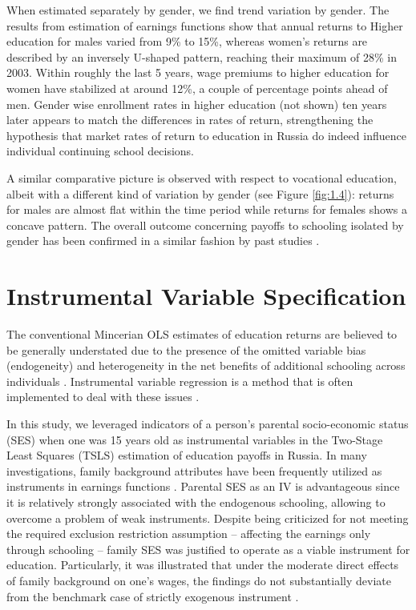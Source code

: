 \documentclass[alpha-refs]{wiley-article-01g}
\begin{document}
When estimated separately by gender, we find trend variation by gender. The results from estimation of earnings functions show that annual returns to Higher education for males varied from 9\% to 15\%, whereas women's returns are described by an inversely U-shaped pattern, reaching their maximum of 28\% in 2003. Within roughly the last 5 years, wage premiums to higher education for women have stabilized at around 12\%, a couple of percentage points ahead of men.  Gender wise enrollment rates in higher education (not shown) ten years later appears to match the differences in rates of return, strengthening the hypothesis that market rates of return to education in Russia do indeed influence individual continuing school decisions. 

A similar comparative picture is observed with respect to vocational education, albeit with a different kind of variation by gender (see Figure \ref{fig:1.4}): returns for males are almost flat within the time period while returns for females shows a concave pattern. The overall outcome concerning payoffs to schooling isolated by gender has been confirmed in a similar fashion by past studies \parencite[e.g.,][]{Cheidvasser2007}.

\section{Instrumental Variable Specification}

The conventional Mincerian OLS estimates of education returns are believed to be generally understated due to the presence of the omitted variable bias (endogeneity) and heterogeneity in the net benefits of additional schooling across individuals \parencite[e.g.,][]{Sakellariou2004, Akhmedjonov2011}. Instrumental variable regression is a method that is often implemented to deal with these issues \parencite[e.g.,][]{Angrist1991, Card2001}.

In this study, we leveraged indicators of a person's parental socio-economic status (SES) when one was 15 years old as instrumental variables in the Two-Stage Least Squares (TSLS) estimation of education payoffs in Russia. In many investigations, family background attributes have been frequently utilized as instruments in earnings functions \parencite[e.g.,][]{Sakellariou2004, Parker2006, Hoogerheide2012}. Parental SES as an IV is advantageous since it is relatively strongly associated with the endogenous schooling, allowing to overcome a problem of weak instruments. Despite being criticized for not meeting the required exclusion restriction assumption -- affecting the earnings only through schooling \parencite{Trostel2002} -- family SES was justified to operate as a viable instrument for education. Particularly, it was illustrated that under the moderate direct effects of family background on one's wages, the findings do not substantially deviate from the benchmark case of strictly exogenous instrument \parencite{Hoogerheide2012}.
\end{document}
